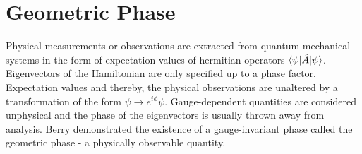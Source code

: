 %

\chapter{Geometric Phase}\label{ch:gp}
Physical measurements or observations are extracted from quantum mechanical systems in the form of expectation values of hermitian operators $\braket{\psi|\hat{A}|\psi}$.
Eigenvectors of the Hamiltonian are only specified up to a phase factor. Expectation values and thereby, the physical observations are unaltered by a transformation of the form 
$\psi \rightarrow e^{i \phi} \psi$. Gauge-dependent quantities are considered unphysical and the phase of the eigenvectors is usually thrown away from analysis. Berry
demonstrated the existence of a gauge-invariant phase called the geometric phase - a physically observable quantity.

